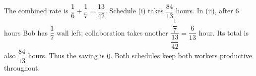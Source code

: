 The combined rate is $\dfrac{1}{6}+\dfrac{1}{7}=\dfrac{13}{42}$. Schedule (i) takes $\dfrac{84}{13}$ hours. In (ii), after 6 hours Bob has $\dfrac{1}{7}$ wall left; collaboration takes another $\dfrac{\dfrac{1}{7}}{\dfrac{13}{42}}=\dfrac{6}{13}$ hour. Its total is also $\dfrac{84}{13}$ hours. Thus the saving is $\boxed0$. Both schedules keep both workers productive throughout.
